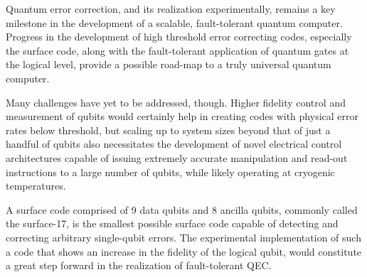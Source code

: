 Quantum error correction, and its realization experimentally, remains a key
milestone in the development of a scalable, fault-tolerant quantum computer.
Progress in the development of high threshold error correcting codes, especially
the surface code, along with the fault-tolerant application of quantum gates at
the logical level, provide a possible road-map to a truly universal quantum
computer.

Many challenges have yet to be addressed, though. Higher fidelity control and
measurement of qubits would certainly help in creating codes with physical error
rates below threshold, but scaling up to system sizes beyond that of just a
handful of qubits also necessitates the development of novel electrical control
architectures capable of issuing extremely accurate manipulation and read-out
instructions to a large number of qubits, while likely operating at cryogenic
temperatures.

A surface code comprised of 9 data qubits and 8 ancilla qubits, commonly called
the surface-17, is the smallest possible surface code capable of detecting and
correcting arbitrary single-qubit errors. The experimental implementation of
such a code that shows an increase in the fidelity of the logical qubit, would
constitute a great step forward in the realization of fault-tolerant QEC.


